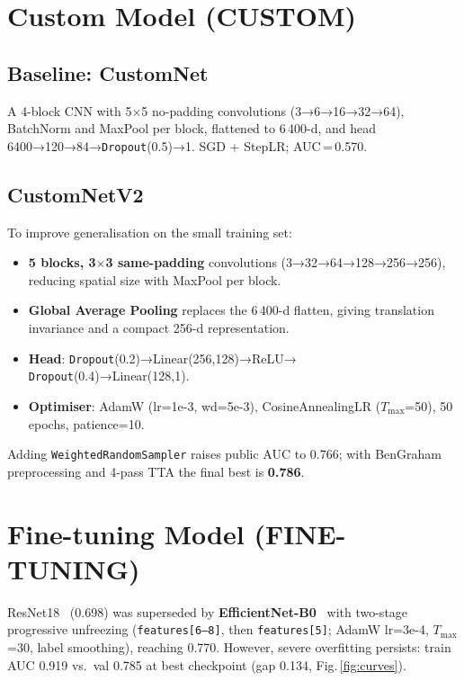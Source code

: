 \documentclass[a4paper, 10pt, twocolumn]{article}
\begin{document}
\section{Custom Model (CUSTOM)}

\subsection{Baseline: CustomNet}
A 4-block CNN with 5$\times$5 no-padding convolutions
(3→6→16→32→64), BatchNorm and MaxPool per block, flattened to 6\,400-d,
and head 6400→120→84→\texttt{Dropout}(0.5)→1. SGD + StepLR; AUC\,=\,0.570.

\subsection{CustomNetV2}
To improve generalisation on the small training set:
\begin{itemize}
  \item \textbf{5 blocks, 3$\times$3 same-padding} convolutions
        (3→32→64→128→256→256), reducing spatial size with MaxPool per block.
  \item \textbf{Global Average Pooling} replaces the 6\,400-d flatten,
        giving translation invariance and a compact 256-d representation.
  \item \textbf{Head}: \texttt{Dropout}(0.2)→Linear(256,128)→ReLU→
        \texttt{Dropout}(0.4)→Linear(128,1).
  \item \textbf{Optimiser}: AdamW (lr=1e-3, wd=5e-3),
        CosineAnnealingLR ($T_\text{max}$=50), 50\,epochs, patience=10.
\end{itemize}
Adding \texttt{WeightedRandomSampler} raises public AUC to 0.766; with
BenGraham preprocessing and 4-pass TTA the final best is \textbf{0.786}.

\section{Fine-tuning Model (FINE-TUNING)}

ResNet18~\cite{he2016deep} (0.698) was superseded by
\textbf{EfficientNet-B0}~\cite{tan2019efficientnet} with two-stage
progressive unfreezing (\texttt{features[6--8]}, then \texttt{features[5]};
AdamW lr=3e-4, $T_\text{max}$=30, label smoothing), reaching 0.770.
However, severe overfitting persists: train AUC 0.919 vs.\ val 0.785 at best
checkpoint (gap 0.134, Fig.\,\ref{fig:curves}).
\end{document}

